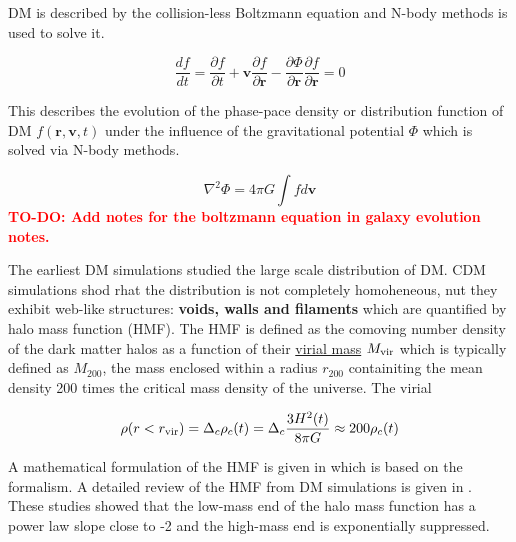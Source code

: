 \documentclass{book}
\newcommand{\todo}[1]{\textcolor{red}{\textbf{TO-DO: #1}}}
\begin{document}
\begin{mybox}[title=Modelling dark matter]

DM is described by the collision-less Boltzmann equation and N-body methods is used to solve it. 

\begin{equation}
    \label{eq:Boltzmann-collisonless}
    \frac{df}{dt} = \frac{\partial f}{\partial t} + \textbf{v} \frac{\partial f}{\partial \textbf{r}} - \frac{\partial \Phi}{\partial \textbf{r}} \frac{\partial f}{\partial \textbf{r}} = 0
\end{equation}

This describes the evolution of the phase-pace density or distribution function of DM $f(\textbf{r},\textbf{v},t)$ under the influence of the gravitational potential $\Phi$ which is solved via N-body methods.

\begin{equation}
    \label{eq:poisson-eqn}
    \nabla^2 \Phi = 4 \pi G \int f d \textbf{v}
\end{equation}
\todo{Add notes for the boltzmann equation in galaxy evolution notes.}

\end{mybox}

The earliest DM simulations studied the large scale distribution of DM. CDM simulations shod rhat the distribution is not completely homoheneous, nut they exhibit web-like structures: \textbf{voids, walls and filaments} which are quantified by halo mass function (HMF). The HMF is defined as the comoving number density of the dark matter halos as a function of their \href{https://en.wikipedia.org/wiki/Virial_mass}{virial mass} $M_{\rm vir}$ which is typically defined as $M_{200}$, the mass enclosed within a radius $r_{200}$ containiting the mean density 200 times the critical mass density of the universe. The virial 

\begin{equation}
    \rho(r < r_{\rm vir}) = \Delta_c \rho_c (t) = \Delta_c \frac{3 H^2(t)}{8 \pi G} \approx 200 \rho_c(t)
\end{equation}

A mathematical formulation of the HMF is given in \citet{Tinker_2008} which is based on the \citet{PS_1974} formalism. A detailed review of the HMF from DM simulations is given in  \citet{Jenkins_2001}. These studies showed that the low-mass end of the halo mass function has a power law slope close to -2 and the high-mass end is exponentially suppressed. 
\end{document}

